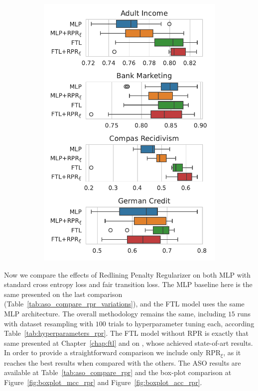 \begin{figure}[!ht]
\begin{subfigure}{.32\linewidth}
    \includegraphics[width=1\linewidth]{images/boxplot_acc_odds_rpr.pdf}
\end{subfigure}
\end{figure}

Now we compare the effects of Redlining Penalty Regularizer on both MLP with standard cross entropy loss and fair transition loss. The MLP baseline here is the same presented on the last comparison (Table~\ref{tab:aso_compare_rpr_variations}), and the FTL model uses the same MLP architecture. The overall methodology remains the same, including $15$ runs with dataset resampling with $100$ trials to hyperparameter tuning each, according Table~\ref{tab:hyperparameters_rpr}. The FTL model without RPR is exactly that same presented at Chapter~\ref{chap:ftl} and on \cite{Canalli2024}, whose achieved state-of-art results. In order to provide a straightforward comparison we include only RPR$_\xi$, as it reaches the best results when compared with the others. The ASO results are available at Table~\ref{tab:aso_compare_rpr} and the box-plot comparison at Figure~\ref{fig:boxplot_mcc_rpr} and Figure~\ref{fig:boxplot_acc_rpr}.

